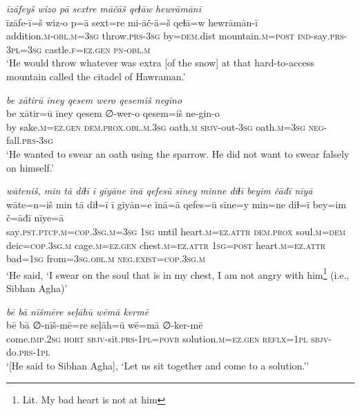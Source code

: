 \ea \label{DP.35}
\textit{īzāfeyš wizo pā sextre māčāš qeɫāw hewrāmānī} \\ 
\gll īzāfe-ī=š wiz-o p=ā sext=re mi-āč-ā=š qeɫā=w hewrāmān-ī \\ 
 addition\textsc{.m}\textsc{-obl}\textsc{.m}\textsc{=3sg} throw\textsc{.prs}\textsc{-3sg} by\textsc{=dem}.dist mountain\textsc{.m}\textsc{=\textsc{post}} \textsc{ind-}say\textsc{.prs}\textsc{-3pl}\textsc{=3sg} castle\textsc{\textsc{.f}}\textsc{=ez}\textsc{.gen} \textsc{pn}\textsc{-obl}\textsc{.m} \\ 
\glt `He would throw whatever was extra [of the snow] at that hard-to-access mountain called the citadel of Hawraman.'
\z 
 
\ea \label{DP.37}
\textit{be xātirū īney qesem wero qesemiš negino} \\ 
\gll be xātir=ū īney qesem ∅-wer-o qesem=iš ne-gin-o \\ 
 by sake\textsc{.m}\textsc{=ez}\textsc{.gen} \textsc{dem.prox}\textsc{.obl}\textsc{.m}\textsc{.3sg} oath\textsc{.m} \textsc{sbjv-}out\textsc{-3sg} oath\textsc{.m}\textsc{=3sg} \textsc{neg-}fall\textsc{.prs}\textsc{-3sg} \\ 
\glt `He wanted to swear an oath using the sparrow. He did not want to swear falsely on himself.'
\z 
 
\ea \label{DP.38}
\textit{wāteniš, min tā diɫī ī gīyāne īnā qefesū sīney minne diɫī beyim čāđī nīyā} \\ 
\gll wāte=n=iš min tā diɫ=ī ī gīyān=e īnā=ā qefes=ū sīne=y min=ne diɫ=ī bey=im č=āđī nīye=ā \\ 
 say\textsc{.pst}\textsc{.ptcp}\textsc{.m}\textsc{=cop}\textsc{.3sg}\textsc{.m}\textsc{=3sg} \textsc{1sg} until heart\textsc{.m}\textsc{=ez}.\textsc{attr} \textsc{dem.prox} soul\textsc{.m}\textsc{=dem} deic\textsc{=cop}\textsc{.3sg}\textsc{.m} cage\textsc{.m}\textsc{=ez}\textsc{.gen} chest\textsc{.m}\textsc{=ez}.\textsc{attr} \textsc{1sg}\textsc{=\textsc{post}} heart\textsc{.m}\textsc{=ez}.\textsc{attr} bad\textsc{=1sg} from\textsc{=3sg}\textsc{.obl}\textsc{.m} \textsc{\textsc{neg.}exist}\textsc{=cop}\textsc{.3sg}\textsc{.m} \\ 
\glt `He said, ‘I swear on the soul that is in my chest, I am not angry with him\footnote{Lit. My bad heart is not at him} (i.e., Sibhan Agha)'
\z 
 
\ea \label{DP.39}
\textit{bē bā nīšmēre seḷāhū wēmā kermē} \\ 
\gll bē bā ∅-nīš-mē=re seḷāh=ū wē=mā ∅-ker-mē \\ 
 come\textsc{.imp}\textsc{.\textsc{2sg}} \textsc{hort} \textsc{sbjv-}sit\textsc{.prs}\textsc{-1pl}\textsc{=\textsc{povb}} solution\textsc{.m}\textsc{=ez}\textsc{.gen} \textsc{reflx}\textsc{=1pl} \textsc{sbjv-}do\textsc{.prs}\textsc{-1pl} \\ 
\glt `[He said to Sibhan Agha], ‘Let us sit together and come to a solution.’'
\z 
 
